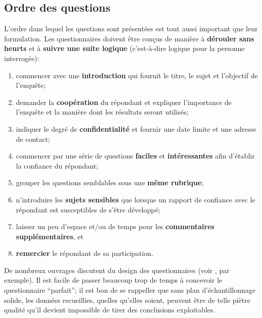 \subsection{Ordre des questions} L'ordre dans lequel les questions sont présentées est tout aussi important que leur formulation. Les questionnaires doivent être conçus de manière à \textbf{dérouler sans heurts} et à \textbf{suivre une suite logique} (c'est-à-dire logique pour la personne interrogée):  
\begin{enumerate}[noitemsep]
\item commencer avec une \textbf{introduction} qui fournit le titre, le sujet et l'objectif de l'enquête;
\item demander la \textbf{coopération} du répondant et expliquer l'importance de l'enquête et la manière dont les résultats seront utilisés;
\item indiquer le degré de \textbf{confidentialité} et fournir une date limite et une adresse de contact;
\item commencer par une série de questions \textbf{faciles} et \textbf{intéressantes} afin d'établir la confiance du répondant;
\item grouper les questions semblables sous une \textbf{même rubrique};
\item n'introduire les \textbf{sujets sensibles} que lorsque un rapport de confiance avec le répondant est susceptibles de s'être développé;
\item laisser un peu d'espace et/ou de temps pour les \textbf{commentaires supplémentaires}, et 
\item \textbf{remercier} le répondant de sa participation.
\end{enumerate}
De nombreux ouvrages discutent du design des questionnaires (voir \cite{DC_O}, par exemple). Il est facile de passer beaucoup trop de temps à concevoir le questionnaire ``parfait''; il est bon de se rappeller que sans plan d'échantillonnage solide, les données recueillies, quelles qu'elles soient, peuvent être de telle piètre qualité qu’il devient impossible de tirer des conclusions exploitables. 